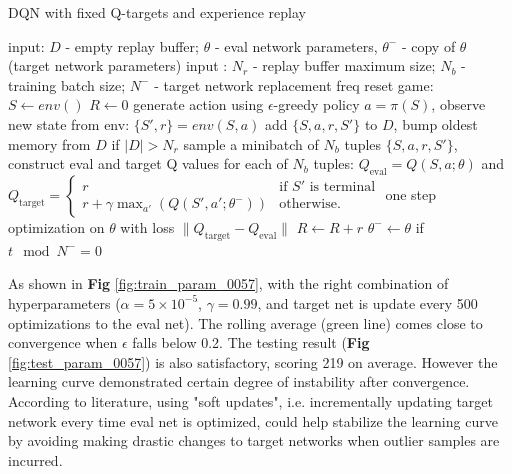 \documentclass[10pt]{article}
\begin{document}
\begin{algorithm}
\caption{DQN with fixed Q-targets and experience replay}
\begin{algorithmic}
\STATE input: $D$ - empty replay buffer; $\theta$ - eval network parameters, $\theta^-$ - copy of $\theta$ (target network parameters)
\STATE input : $N_r$ - replay buffer maximum size; $N_b$ - training batch size; $N^-$ - target network replacement freq
\REPEAT
\STATE reset game: $S\leftarrow env()$
\STATE $R\leftarrow 0$
\STATE generate action using $\epsilon$-greedy policy $a=\pi(S)$, observe new state from env: $\{S',r\} = env(S,a)$
\STATE add $\{S,a,r,S'\}$ to $D$, bump oldest memory from $D$ if $|D|> N_r$
\STATE sample a minibatch of $N_b$ tuples $\{S,a,r,S'\}$, construct eval and target Q values for each of $N_b$ tuples:
\STATE $Q_{\text{eval}}=Q(S,a;\theta)$ and $Q_{\text{target}}=\left\{
\begin{array}{lr}
             r & \text{if $S'$ is terminal} \\
             r+\gamma \max_{a'}(Q(S',a';\theta^-)) & \text{otherwise.}
\end{array}
\right.
$
\STATE one step optimization on $\theta$ with loss $\lVert Q_{\text{target}}-Q_{\text{eval}}\rVert$
\STATE $R\leftarrow R+r$
\STATE $\theta^- \leftarrow \theta$ if $t\mod N^- = 0$
\ENDFOR
{}
\end{algorithmic}
\end{algorithm}

As shown in \textbf{Fig} \ref{fig:train_param_0057}, with the right combination of hyperparameters ($\alpha=5\times 10^{-5}$, $\gamma=0.99$, and target net is update every 500 optimizations to the eval net). The rolling average (green line) comes close to convergence when $\epsilon$ falls below 0.2. The testing result (\textbf{Fig} \ref{fig:test_param_0057}) is also satisfactory, scoring 219 on average. However the learning curve demonstrated certain degree of instability after convergence. According to literature, using "soft updates", i.e. incrementally updating target network every time eval net is optimized, could help stabilize the learning curve by avoiding making drastic changes to target networks when outlier samples are incurred.
\end{document}
